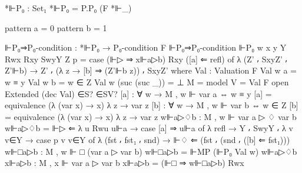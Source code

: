 \begin{spverbatim}
  *⊩P₀ : Set₁
  *⊩P₀ = P.P₀ (F *⊩_)

  pattern a = 0
  pattern b = 1

  ⊩P₀⇒P₀-condition : *⊩P₀ → P₀-condition F
  ⊩P₀⇒P₀-condition ⊩P₀ {w} {x} {y} {Y} Rwx Rxy SwyY Z p =
    case (⊩▷ ⇒ x⊩a▷b) Rxy ([a] ⇐ refl) of
    λ { (Z' ⸴ SxyZ' ⸴ Z'⊩b) → Z' ⸴ (λ {z → [b] ⇒ (Z'⊩b z)}) ⸴ SxyZ'}
    where
    Val : Valuation F
    Val w a = w ≡ y
    Val w b = w ∈ Z
    Val w (suc (suc _)) = ⊥
    M = model {V = Val} F
    open Extended (dec Val) ∈S? ∈SV?
    [a] : ∀ {w} → M , w ⊩ var a ⇔ w ≡ y
    [a] = equivalence (λ { (var x) → x}) λ {z → var z}
    [b] : ∀ {w} → M , w ⊩ var b ⇔ w ∈ Z
    [b] = equivalence (λ { (var x) → x}) λ {z → var z}
    w⊩a▷♢b : M , w ⊩ var a ▷ ♢ var b
    w⊩a▷♢b = ⊩▷ ⇐ λ { {u} Rwu u⊩a → case [a] ⇒ u⊩a of
      λ { refl → Y ⸴ SwyY ⸴ λ { {v} v∈Y → case p v v∈Y of
      λ { (fst ⸴ fst₁ ⸴ snd) → ⊩♢ ⇐ (fst ⸴ (snd ⸴ ([b] ⇐ fst₁)))}}}}
    w⊩□a▷b : M , w ⊩ □ (var a ▷ var b)
    w⊩□a▷b = ⊩MP (⊩P₀ Val w) w⊩a▷♢b
    x⊩a▷b : M , x ⊩ var a ▷ var b
    x⊩a▷b = (⊩□ ⇒ w⊩□a▷b) Rwx
\end{spverbatim}
